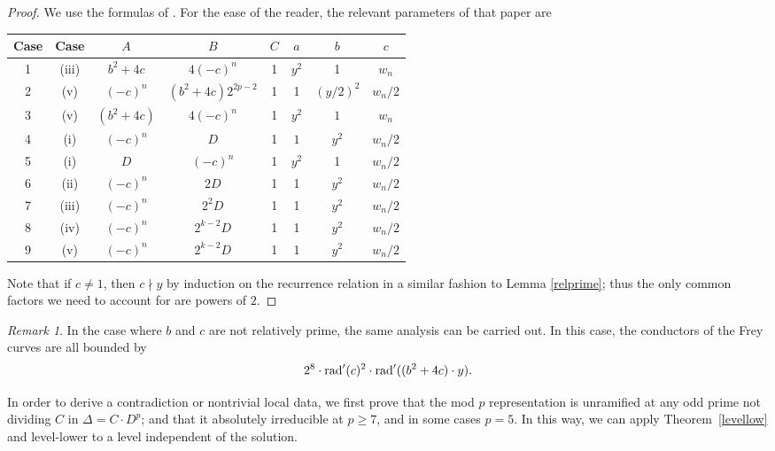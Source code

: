 \documentclass[12pt]{amsart}
\theoremstyle{definition}
\theoremstyle{remark}
\newtheorem*{rem}{Remark}
\newcommand{\rad}{{\rm{rad}}}
\newcommand{\notdiv}{\nmid}
\begin{document}
\begin{proof}
We use the formulas of \cite{bennett04}.  For the ease of the reader, the relevant parameters of that paper are 
\begin{center} 
\begin{tabular}{c | c | c | c | c | c | c | c}
Case & \cite{bennett04} Case & $A$ & $B$ & $C$ & $a$ & $b$ & $c$ \\ \hline \hline
1 & (iii) & $b^2+4c$ & $4(-c)^n$ & 1 & $y^2$ & 1 & $w_n$ \\ \hline
2 & (v) & $(-c)^n$ & $(b^2+4c)2^{2p-2}$ & 1 & 1 & $(y/2)^2$ & $w_n/2$ \\ \hline
3 & (v) & $(b^2+4c)$ & $4(-c)^n$ & 1 & $y^2$ & $1$ & $w_n$ \\ \hline
4 & (i) & $(-c)^n$ & $D$ & 1 & $1$ & $y^2$ & $w_n/2$ \\ \hline
5 & (i) & $D$ & $(-c)^n$ & 1 & $y^2$ & 1 & $w_n/2$ \\ \hline
6 & (ii) & $(-c)^n$ & $2D$ & 1 & 1 & $y^2$ & $w_n/2$ \\ \hline
7 & (iii) & $(-c)^n$ & $2^2D$ & 1 & 1 & $y^2$ & $w_n/2$ \\ \hline
8 & (iv) & $(-c)^n$ & $2^{k-2}D$ & 1 & 1 & $y^2$ & $w_n/2$ \\ \hline
9 & (v) & $(-c)^n$ & $2^{k-2}D$ & 1 & 1 & $y^2$ & $w_n/2$ \\ \hline
\end{tabular}
\end{center}
Note that if $c \neq 1$, then $c \notdiv y$ by induction on the recurrence relation in a similar fashion to Lemma \ref{relprime}; thus the only common factors we need to account for are powers of $2$.
\end{proof}

\begin{rem}\label{not_rel_prime}
In the case where $b$ and $c$ are not relatively prime, the same analysis can be carried out.  In this case, the conductors of the Frey curves are all bounded by 
\[ 2^8 \cdot {\rad}'(c)^2 \cdot {\rad}'((b^2+4c)\cdot y). \]
\end{rem}

In order to derive a contradiction or nontrivial local data, we first prove that the mod $p$ representation is unramified at any odd prime not dividing $C$ in $\Delta = C \cdot D^p$; and that it absolutely irreducible at $p \geq 7$, and in some cases $p=5$.  In this way, we can apply Theorem~\ref{levellow} and level-lower to a level independent of the solution.  
\end{document}
